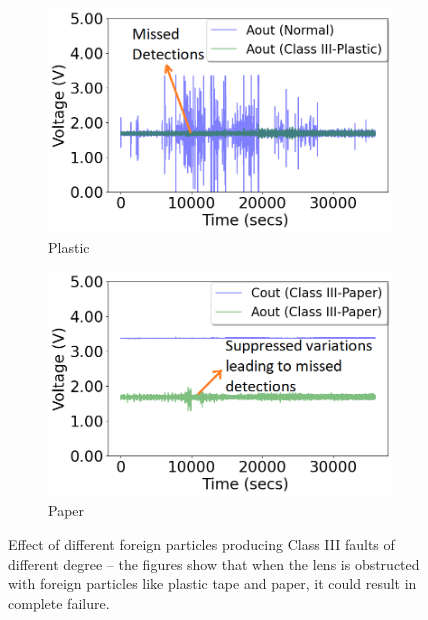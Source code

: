 \begin{figure}%
	\centering
	\begin{subfigure}[t]{0.3\textwidth}
		\centering
		\includegraphics[width=\textwidth]{figures/2-PIR-Fault/normal-classIII/Aout_normal_vs_plastic.png}
		\caption{Plastic}
		\label{fig:pir_sensor_classIII_fault_plastic_tape}
	\end{subfigure}
	\begin{subfigure}[t]{0.3\textwidth}
		\centering
		\includegraphics[width=\textwidth]{figures/2-PIR-Fault/normal-classIII/Cout_Aout_Paper.png}
		\caption{Paper}
		\label{fig:pir_sensor_classIII_fault_paper}
	\end{subfigure}	
	\caption{Effect of different foreign particles producing Class III faults of different degree -- the figures show that when the lens is obstructed with foreign particles like plastic tape and paper, it could result in complete failure.}
	\label{fig:pir_sensor_different_foreign_particles}
\end{figure}

